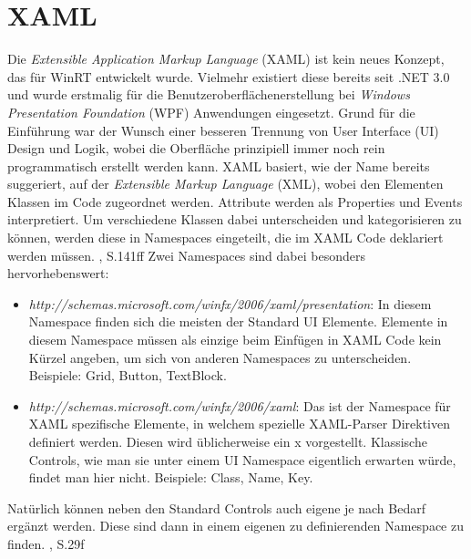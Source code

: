 \documentclass[a4paper,bibtotoc,oneside]{scrbook}
\begin{document}
\section[XAML]{XAML}\label{sec:XAML}
Die \textit{Extensible Application Markup Language} (XAML) ist kein neues Konzept, das für WinRT entwickelt wurde. Vielmehr existiert diese bereits seit .NET 3.0 und wurde erstmalig für die Benutzeroberflächenerstellung bei \textit{Windows Presentation Foundation} (WPF) Anwendungen eingesetzt. Grund für die Einführung war der Wunsch einer besseren Trennung von User Interface (UI) Design und Logik, wobei die Oberfläche prinzipiell immer noch rein programmatisch erstellt werden kann.
\newline
\newline
XAML basiert, wie der Name bereits suggeriert, auf der \textit{Extensible Markup Language} (XML), wobei den Elementen Klassen im Code zugeordnet werden. Attribute werden als Properties und Events interpretiert. Um verschiedene Klassen dabei unterscheiden und kategorisieren zu können, werden diese in Namespaces eingeteilt, die im XAML Code deklariert werden müssen. 
\cite{wpf10}, S.141ff
\newline
\newline
Zwei Namespaces sind dabei besonders hervorhebenswert: 
\begin{itemize}
\item \textit{http://schemas.microsoft.com/winfx/2006/xaml/presentation}:
\newline
In diesem Namespace finden sich die meisten der Standard UI Elemente. Elemente in diesem Namespace müssen als einzige beim Einfügen in XAML Code kein Kürzel angeben, um sich von anderen Namespaces zu unterscheiden.
\newline
\newline
Beispiele: Grid, Button, TextBlock.
\item \textit{http://schemas.microsoft.com/winfx/2006/xaml}:
\newline
Das ist der Namespace für XAML spezifische Elemente, in welchem spezielle XAML-Parser Direktiven definiert werden.
\newline
Diesen wird üblicherweise ein x vorgestellt.
\newline
Klassische Controls, wie man sie unter einem UI Namespace eigentlich erwarten würde, findet man hier nicht.
\newline
\newline
Beispiele: Class, Name, Key.
\end{itemize} 
Natürlich können neben den Standard Controls auch eigene je nach Bedarf ergänzt werden. Diese sind dann in einem eigenen zu definierenden Namespace zu finden. \cite{ana12}, S.29f
\end{document}
